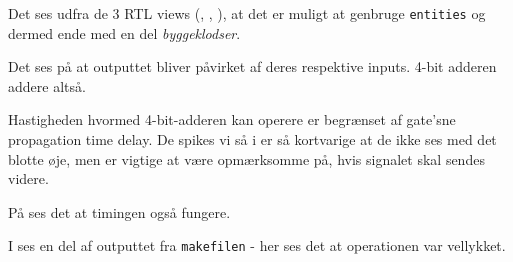 

Det ses udfra de 3 RTL views (, , ), at det er muligt at genbruge \texttt{entities} og dermed ende med en del \textit{byggeklodser}.



Det ses på  at outputtet bliver påvirket af deres respektive inputs. 4-bit adderen addere altså.

Hastigheden hvormed 4-bit-adderen kan operere er begrænset af gate'sne propagation time delay. De spikes vi så i  er så kortvarige at de ikke ses med det blotte øje, men er vigtige at være opmærksomme på, hvis signalet skal sendes videre.

På  ses det at timingen også fungere.

I  ses en del af outputtet fra \texttt{makefilen} -
her ses det at operationen var vellykket.

